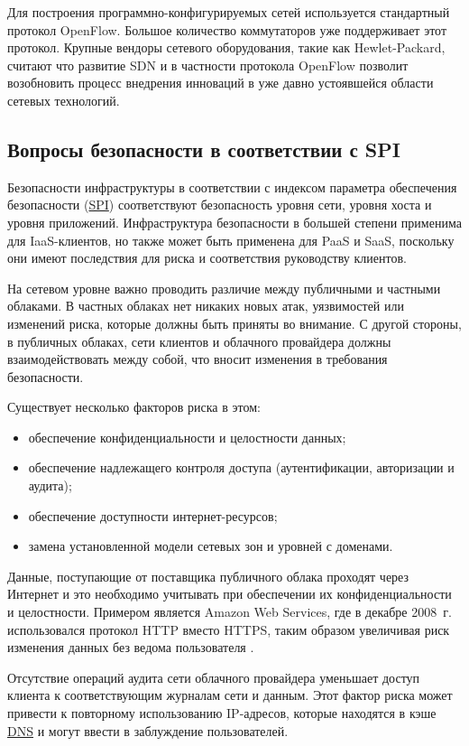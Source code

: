 Для построения программно-конфигурируемых сетей используется стандартный протокол OpenFlow.
Большое количество коммутаторов уже поддерживает этот протокол.
Крупные вендоры сетевого оборудования, такие как Hewlet-Packard, считают что развитие SDN и в частности протокола OpenFlow позволит возобновить процесс внедрения инноваций в уже давно устоявшейся области сетевых технологий.

\subsection{Вопросы безопасности в соответствии с SPI}

Безопасности инфраструктуры в соответствии с индексом параметра обеспечения безопасности (\hyperlink{spi}{SPI}) соответствуют безопасность уровня сети, уровня хоста и уровня приложений.
Инфраструктура безопасности в большей степени применима для IaaS-клиентов, но также может быть применена для PaaS и SaaS, поскольку они имеют последствия для риска и соответствия руководству клиентов.

На сетевом уровне важно проводить различие между публичными и частными облаками.
В частных облаках нет никаких новых атак, уязвимостей или изменений риска, которые должны быть приняты во внимание.
С другой стороны, в публичных облаках, сети клиентов и облачного провайдера должны взаимодействовать между собой, что вносит изменения в требования безопасности.

Существует несколько факторов риска в этом:
\begin{itemize}
  \item обеспечение конфиденциальности и целостности данных;
  \item обеспечение надлежащего контроля доступа (аутентификации, авторизации и аудита);
  \item обеспечение доступности интернет-ресурсов;
  \item замена установленной модели сетевых зон и уровней с доменами.
\end{itemize}

Данные, поступающие от поставщика публичного облака проходят через Интернет и это необходимо учитывать при обеспечении их конфиденциальности и целостности.
Примером является Amazon Web Services, где в декабре 2008~г. использовался протокол HTTP вместо HTTPS, таким образом увеличивая риск изменения данных без ведома пользователя \cite{aws}.

Отсутствие операций аудита сети облачного провайдера уменьшает доступ клиента к соответствующим журналам сети и данным.
Этот фактор риска может привести к повторному использованию IP-адресов, которые находятся в кэше \hyperlink{dns}{DNS} и могут ввести в заблуждение пользователей.

